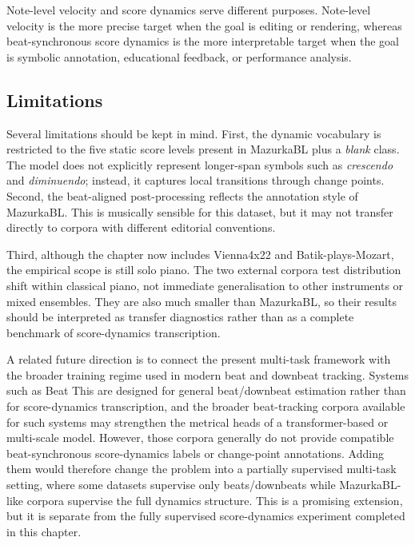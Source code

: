 Note-level velocity and score dynamics serve different purposes. Note-level velocity is the more precise target when the goal is editing or rendering, whereas beat-synchronous score dynamics is the more interpretable target when the goal is symbolic annotation, educational feedback, or performance analysis.

\subsection{Limitations}
\label{ssec:audiodyn_limits}

Several limitations should be kept in mind. First, the dynamic vocabulary is restricted to the five static score levels present in MazurkaBL plus a \textit{blank} class. The model does not explicitly represent longer-span symbols such as \textit{crescendo} and \textit{diminuendo}; instead, it captures local transitions through change points. Second, the beat-aligned post-processing reflects the annotation style of MazurkaBL. This is musically sensible for this dataset, but it may not transfer directly to corpora with different editorial conventions.

Third, although the chapter now includes Vienna4x22 and Batik-plays-Mozart, the empirical scope is still solo piano. The two external corpora test distribution shift within classical piano, not immediate generalisation to other instruments or mixed ensembles. They are also much smaller than MazurkaBL, so their results should be interpreted as transfer diagnostics rather than as a complete benchmark of score-dynamics transcription.

A related future direction is to connect the present multi-task framework with the broader training regime used in modern beat and downbeat tracking. Systems such as Beat This \cite{foscarin2024beat} are designed for general beat/downbeat estimation rather than for score-dynamics transcription, and the broader beat-tracking corpora available for such systems may strengthen the metrical heads of a transformer-based or multi-scale model. However, those corpora generally do not provide compatible beat-synchronous score-dynamics labels or change-point annotations. Adding them would therefore change the problem into a partially supervised multi-task setting, where some datasets supervise only beats/downbeats while MazurkaBL-like corpora supervise the full dynamics structure. This is a promising extension, but it is separate from the fully supervised score-dynamics experiment completed in this chapter.

